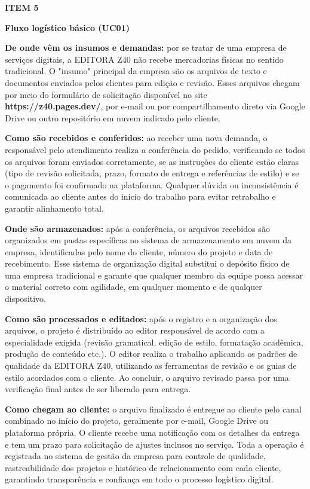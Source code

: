 \documentclass[10pt,a4paper]{article}
\newcommand{\zsiteplain}{https://\allowbreak{}z40.pages\allowbreak{}.dev/\allowbreak{}}
\newcommand{\zsite}{\textbf{\zsiteplain}}
\newcommand{\labelfont}{\fontsize{5.8}{7.5}\selectfont\bfseries\addfontfeatures{LetterSpace=15}}
\newcommand{\headingfont}{\fontsize{9.8}{12}\selectfont\bfseries\color{navy}}
\newcommand{\separador}{\vspace{16pt}{\color{rulegray}\rule{\linewidth}{0.6pt}}\vspace{10pt}}
\newcommand{\itemh}[2]{\needspace{6\baselineskip}%
  {\labelfont\color{graylab}ITEM #1}\par\vspace{5pt}%
  {\headingfont #2}\par\vspace{8pt}}
\begin{document}
\separador
\itemh{5}{Fluxo logístico básico (UC01)}

\textbf{De onde vêm os insumos e demandas:} por se tratar de uma empresa de serviços digitais, a EDITORA Z40 não recebe mercadorias físicas no sentido tradicional. O "insumo" principal da empresa são os arquivos de texto e documentos enviados pelos clientes para edição e revisão. Esses arquivos chegam por meio do formulário de solicitação disponível no site \zsite, por e-mail ou por compartilhamento direto via Google Drive ou outro repositório em nuvem indicado pelo cliente.

\textbf{Como são recebidos e conferidos:} ao receber uma nova demanda, o responsável pelo atendimento realiza a conferência do pedido, verificando se todos os arquivos foram enviados corretamente, se as instruções do cliente estão claras (tipo de revisão solicitada, prazo, formato de entrega e referências de estilo) e se o pagamento foi confirmado na plataforma. Qualquer dúvida ou inconsistência é comunicada ao cliente antes do início do trabalho para evitar retrabalho e garantir alinhamento total.

\textbf{Onde são armazenados:} após a conferência, os arquivos recebidos são organizados em pastas específicas no sistema de armazenamento em nuvem da empresa, identificadas pelo nome do cliente, número do projeto e data de recebimento. Esse sistema de organização digital substitui o depósito físico de uma empresa tradicional e garante que qualquer membro da equipe possa acessar o material correto com agilidade, em qualquer momento e de qualquer dispositivo.

\textbf{Como são processados e editados:} após o registro e a organização dos arquivos, o projeto é distribuído ao editor responsável de acordo com a especialidade exigida (revisão gramatical, edição de estilo, formatação acadêmica, produção de conteúdo etc.). O editor realiza o trabalho aplicando os padrões de qualidade da EDITORA Z40, utilizando as ferramentas de revisão e os guias de estilo acordados com o cliente. Ao concluir, o arquivo revisado passa por uma verificação final antes de ser liberado para entrega.

\textbf{Como chegam ao cliente:} o arquivo finalizado é entregue ao cliente pelo canal combinado no início do projeto, geralmente por e-mail, Google Drive ou plataforma própria. O cliente recebe uma notificação com os detalhes da entrega e tem um prazo para solicitação de ajustes inclusos no serviço. Toda a operação é registrada no sistema de gestão da empresa para controle de qualidade, rastreabilidade dos projetos e histórico de relacionamento com cada cliente, garantindo transparência e confiança em todo o processo logístico digital.
\end{document}
